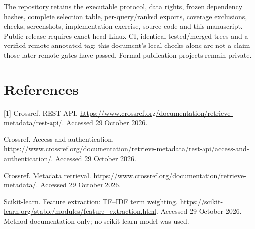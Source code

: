 \documentclass[10pt,letterpaper]{article}
\begin{document}
The repository retains the executable protocol, data rights, frozen dependency hashes, complete selection table, per-query/ranked exports, coverage exclusions, checks, screenshots, implementation exercise, source code and this manuscript. Public release requires exact-head Linux CI, identical tested/merged trees and a verified remote annotated tag; this document's local checks alone are not a claim those later remote gates have passed. Formal-publication projects remain private.

\section*{References}
{\small
[1] Crossref. REST API. \url{https://www.crossref.org/documentation/retrieve-metadata/rest-api/}. Accessed 29 October 2026.\par
[2] Crossref. Access and authentication. \url{https://www.crossref.org/documentation/retrieve-metadata/rest-api/access-and-authentication/}. Accessed 29 October 2026.\par
[3] Crossref. Metadata retrieval. \url{https://www.crossref.org/documentation/retrieve-metadata/}. Accessed 29 October 2026.\par
[4] Scikit-learn. Feature extraction: TF--IDF term weighting. \url{https://scikit-learn.org/stable/modules/feature_extraction.html}. Accessed 29 October 2026. Method documentation only; no scikit-learn model was used.}
\end{document}
